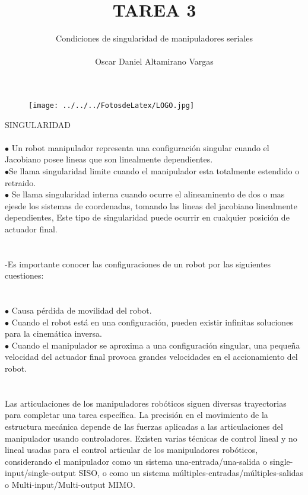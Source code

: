 \documentclass[12pt]{article}
\title{TAREA 3}
\author{Condiciones de singularidad de manipuladores seriales \\ \\ Oscar Daniel Altamirano Vargas\\}
\begin{document}
 
\maketitle
\begin{figure}[hbtp]
\centering
\texttt{[image: ../../../FotosdeLatex/LOGO.jpg]}
\end{figure}
\pagebreak
SINGULARIDAD\cite{monografia2015} \\ \\

$\bullet$ Un robot manipulador representa una configuración singular cuando el Jacobiano posee lineas que son linealmente dependientes. \\
$ \bullet $Se llama singularidad limite cuando el manipulador esta totalmente estendido o retraido. \\
$ \bullet $ Se llama singularidad interna cuando ocurre el alineaminento de dos o mas ejesde los sistemas de coordenadas, tomando las lineas del jacobiano linealmente dependientes, Este tipo de singularidad puede ocurrir en cualquier posición de actuador final.\\  \\ \\
-Es importante conocer las configuraciones de un robot por las siguientes cuestiones:\\ \\  \\
$ \bullet $ Causa pérdida de movilidad del robot.\\
$ \bullet $ Cuando el robot está en una configuración, pueden existir infinitas soluciones para la cinemática inversa. \\
$ \bullet $ Cuando el manipulador se aproxima a una configuración singular, una pequeña velocidad del actuador final provoca grandes velocidades en el accionamiento del robot.\\ \\ \\  
Las articulaciones de los manipuladores robóticos siguen diversas trayectorias para completar una tarea específica. La precisión en el movimiento de la estructura mecánica depende de las fuerzas aplicadas a las articulaciones del manipulador usando controladores. Existen varias técnicas de control lineal y no lineal usadas para el control articular de los manipuladores robóticos, considerando el manipulador como un sistema una-entrada/una-salida o single-input/single-output SISO, o como un sistema múltiples-entradas/múltiples-salidas o Multi-input/Multi-output MIMO. 
 

\pagebreak
\nocite{*} 

 \\
\end{document}
